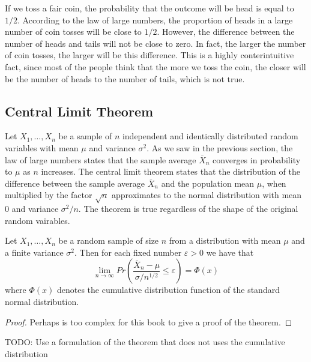 \begin{example}
\label{ex:gambler's_fallacy}
If we toss a fair coin, the probability that the outcome will be head is equal to $1/2$. According to the law of large numbers, the proportion of heads in a large number of coin tosses will be close to $1/2$. However, the difference between the number of heads and tails will not be close to zero. In fact, the larger the number of coin tosses, the larger will be this difference. This is a highly conterintuitive fact, since most of the people think that the more we toss the coin, the closer will be the number of heads to the number of tails, which is not true.
\end{example}


\subsection{Central Limit Theorem}

Let $X_1, \ldots, X_n$ be a sample of $n$ independent and identically distributed random variables with mean $\mu$ and variance $\sigma^2$. As we saw in the previous section, the law of large numbers states that the sample average $\overline {X}_n$ converges in probability to $\mu$ as $n$ increases. The central limit theorem states that the distribution of the difference between the sample average $\overline {X}_n$ and the population mean $\mu$, when multiplied by the factor $\sqrt {n}$ approximates to the normal distribution with mean $0$ and variance $\sigma^2 / n$. The theorem is true regardless of the shape of the original random vairables.

\begin{theorem}
Let $X_{1}, \ldots, X_{n}$ be a random sample of size $n$ from a distribution with mean $\mu$ and a finite variance $\sigma^{2}$. Then  for each fixed number $\varepsilon > 0$ we have that
\[
\lim_{n \rightarrow \infty} Pr \left( \frac{\overline{X}_{n}-\mu}{\sigma/n^{1/2}} \leq \varepsilon \right) = \Phi \left( x \right)
\]
where $\Phi \left( x \right)$ denotes the cumulative distribution function of the standard normal distribution.
\end{theorem}
\begin{proof}
{\color{red} Perhaps is too complex for this book to give a proof of the theorem.}
\end{proof}

{\color{red} TODO: Use a formulation of the theorem that does not uses the cumulative distribution}

